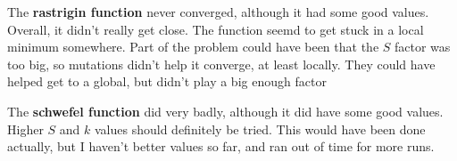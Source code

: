 \documentclass[12pt]{article}
\begin{document}
The \textbf{rastrigin function} never converged, although it had some good values. Overall, it didn't really get close. The function seemd to get stuck in a local minimum somewhere. Part of the problem could have been that the $ S $ factor was too big, so mutations didn't help it converge, at least locally. They could have helped get to a global, but didn't play a big enough factor


The \textbf{schwefel function} did very badly, although it did have some good values. Higher $ S $ and $ k $ values should definitely be tried. This would have been done actually, but I haven't better values so far, and ran out of time for more runs.
\end{document}
